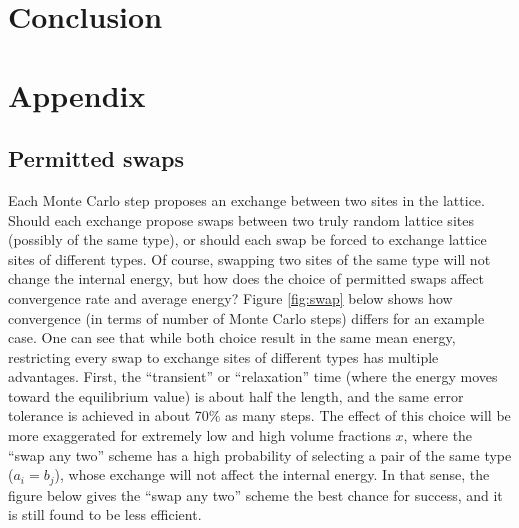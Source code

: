 \documentclass[10pt]{article}
\begin{document}
\section{Conclusion}




\clearpage
\section{Appendix}
\subsection{Permitted swaps}
Each Monte Carlo step proposes an exchange between two sites in the lattice.
Should each exchange propose swaps between two truly random lattice sites (possibly of the same type), or should each swap be forced to exchange lattice sites of different types.
Of course, swapping two sites of the same type will not change the internal energy, but how does the choice of permitted swaps affect convergence rate and average energy?
Figure \ref{fig:swap} below shows how convergence (in terms of number of Monte Carlo steps) differs for an example case.
One can see that while both choice result in the same mean energy, restricting every swap to exchange sites of different types has multiple advantages.
First, the ``transient'' or ``relaxation'' time (where the energy moves toward the equilibrium value) is about half the length, and the same error tolerance is achieved in about 70\% as many steps.
The effect of this choice will be more exaggerated for extremely low and  high volume fractions $x$, where the ``swap any two'' scheme has a high probability of selecting a pair of the same type ($a_i = b_j$), whose exchange will not affect the internal energy.
In that sense, the figure below gives the ``swap any two'' scheme the best chance for success, and it is still found to be less efficient.
\end{document}
